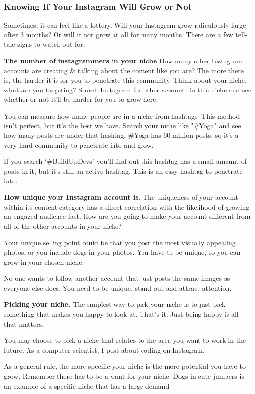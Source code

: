 \documentclass{article}
\begin{document}
\subsubsection{Knowing If Your Instagram Will Grow or Not}
Sometimes, it can feel like a lottery. Will your Instagram grow
ridiculously large after 3 months? Or will it not grow at all for many
months. There are a few tell-tale signs to watch out for.

\textbf{The number of instagrammers in your niche}
How many other Instagram accounts are creating \& talking about the
content like you are? The more there is, the harder it is for you to
penetrate this community. Think about your niche, what are you
targeting? Search Instagram for other accounts in this niche and see
whether or not it'll be harder for you to grow here.

You can measure how many people are in a niche from hashtags. This
method isn't perfect, but it's the best we have. Search your niche like
"\#Yoga" and see how many posts are under that hashtag. \#Yoga has 60
million posts, so it's a very hard community to penetrate into and grow.

If you search `\#BuildUpDevs' you'll find out this hashtag has a small
amount of posts in it, but it's still an active hashtag. This is an easy
hashtag to penetrate into.

\textbf{How unique your Instagram account is.}
The uniqueness of your account within its content category has a direct
correlation with the likelihood of growing an engaged audience fast. How
are you going to make your account different from all of the other
accounts in your niche?

Your unique selling point could be that you post the most visually
appealing photos, or you include dogs in your photos. You have to be
unique, so you can grow in your chosen niche.

No one wants to follow another account that just posts the same images
as everyone else does. You need to be unique, stand out and attract
attention.

\textbf{Picking your niche.}
The simplest way to pick your niche is to just pick something that makes
you happy to look at. That's it. Just being happy is all that matters.

You may choose to pick a niche that relates to the area you want to work
in the future. As a computer scientist, I post about coding on
Instagram.

As a general rule, the more specific your niche is the more potential
you have to grow. Remember there has to be a want for your niche. Dogs
in cute jumpers is an example of a specific niche that has a large
demand.
\end{document}
